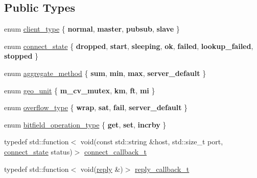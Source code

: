 \subsection*{Public Types}
\begin{DoxyCompactItemize}
\item 
enum \mbox{\hyperlink{classcpp__redis_1_1client_a388877b01b4e045cddb138e70a68e000}{client\+\_\+type}} \{ {\bfseries normal}, 
{\bfseries master}, 
{\bfseries pubsub}, 
{\bfseries slave}
 \}
\item 
enum \mbox{\hyperlink{classcpp__redis_1_1client_a2512bd48dd45391249a69bd720c1e4da}{connect\+\_\+state}} \{ \newline
{\bfseries dropped}, 
{\bfseries start}, 
{\bfseries sleeping}, 
{\bfseries ok}, 
\newline
{\bfseries failed}, 
{\bfseries lookup\+\_\+failed}, 
{\bfseries stopped}
 \}
\item 
enum \mbox{\hyperlink{classcpp__redis_1_1client_aa197ca5b36da793c701d3ba388ec4946}{aggregate\+\_\+method}} \{ {\bfseries sum}, 
{\bfseries min}, 
{\bfseries max}, 
{\bfseries server\+\_\+default}
 \}
\item 
enum \mbox{\hyperlink{classcpp__redis_1_1client_aa5998536fd32ff4387c89be514997620}{geo\+\_\+unit}} \{ {\bfseries m_cv_mutex},
{\bfseries km}, 
{\bfseries ft}, 
{\bfseries mi}
 \}
\item 
enum \mbox{\hyperlink{classcpp__redis_1_1client_a4119182ad3a01c1bb626a174375e114a}{overflow\+\_\+type}} \{ {\bfseries wrap}, 
{\bfseries sat}, 
{\bfseries fail}, 
{\bfseries server\+\_\+default}
 \}
\item 
enum \mbox{\hyperlink{classcpp__redis_1_1client_a2e2023534299541da0a659802e2f087d}{bitfield\+\_\+operation\+\_\+type}} \{ {\bfseries get}, 
{\bfseries set}, 
{\bfseries incrby}
 \}
\item 
typedef std\+::function$<$ void(const std\+::string \&host, std\+::size\+\_\+t port, \mbox{\hyperlink{classcpp__redis_1_1client_a2512bd48dd45391249a69bd720c1e4da}{connect\+\_\+state}} status)$>$ \mbox{\hyperlink{classcpp__redis_1_1client_a8e8f308847caf0b9ce06b817253c65c7}{connect\+\_\+callback\+\_\+t}}
\item 
typedef std\+::function$<$ void(\mbox{\hyperlink{classcpp__redis_1_1reply}{reply}} \&)$>$ \mbox{\hyperlink{classcpp__redis_1_1client_af7a65eb21aa25230bfbb0b0203c4fc04}{reply\+\_\+callback\+\_\+t}}
\end{DoxyCompactItemize}
